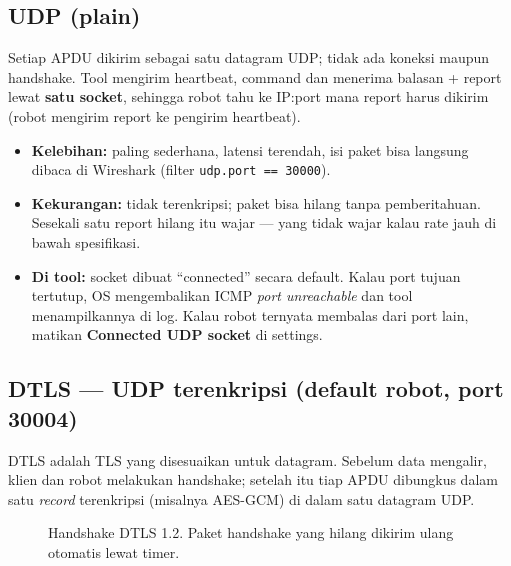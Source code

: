 \documentclass[11pt,a4paper]{article}
\newcommand{\code}[1]{\texttt{#1}}
\newcommand{\ui}[1]{\textbf{#1}}
\begin{document}
\subsection{UDP (plain)}
Setiap APDU dikirim sebagai satu datagram UDP; tidak ada koneksi maupun handshake. Tool mengirim heartbeat,
command dan menerima balasan + report lewat \textbf{satu socket}, sehingga robot tahu ke IP:port mana report
harus dikirim (robot mengirim report ke pengirim heartbeat).
\begin{itemize}
\item \textbf{Kelebihan:} paling sederhana, latensi terendah, isi paket bisa langsung dibaca di Wireshark
      (filter \code{udp.port == 30000}).
\item \textbf{Kekurangan:} tidak terenkripsi; paket bisa hilang tanpa pemberitahuan. Sesekali satu report hilang
      itu wajar --- yang tidak wajar kalau rate jauh di bawah spesifikasi.
\item \textbf{Di tool:} socket dibuat ``connected'' secara default. Kalau port tujuan tertutup, OS mengembalikan
      ICMP \emph{port unreachable} dan tool menampilkannya di log. Kalau robot ternyata membalas dari port lain,
      matikan \ui{Connected UDP socket} di settings.
\end{itemize}

\subsection{DTLS --- UDP terenkripsi (default robot, port 30004)}
DTLS adalah TLS yang disesuaikan untuk datagram. Sebelum data mengalir, klien dan robot melakukan handshake;
setelah itu tiap APDU dibungkus dalam satu \emph{record} terenkripsi (misalnya AES-GCM) di dalam satu datagram UDP.

\begin{figure}[htbp]
\centering
{}
\caption{Handshake DTLS 1.2. Paket handshake yang hilang dikirim ulang otomatis lewat timer.}
\end{figure}
\end{document}
